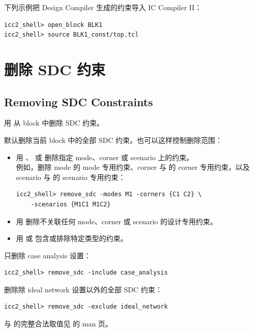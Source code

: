 下列示例把 Design Compiler 生成的约束导入 IC Compiler II：
\begin{lstlisting}
icc2_shell> open_block BLK1
icc2_shell> source BLK1_const/top.tcl
\end{lstlisting}

\section{删除 SDC 约束}
\subsection*{Removing SDC Constraints}

用  从 block 中删除 SDC 约束。

默认删除当前 block 中的全部 SDC 约束。也可以这样控制删除范围：
\begin{itemize}
  \item 用 、 或  删除指定 mode、corner 或 scenario 上的约束。\\
        例如，删除 mode  的 mode 专用约束、corner  与  的 corner 专用约束，以及 scenario  与  的 scenario 专用约束：
\begin{lstlisting}
icc2_shell> remove_sdc -modes M1 -corners {C1 C2} \
    -scenarios {M1C1 M1C2}
\end{lstlisting}
  \item 用  删除不关联任何 mode、corner 或 scenario 的设计专用约束。
  \item 用  或  包含或排除特定类型的约束。
\end{itemize}

只删除 case analysis 设置：
\begin{lstlisting}
icc2_shell> remove_sdc -include case_analysis
\end{lstlisting}

删除除 ideal network 设置以外的全部 SDC 约束：
\begin{lstlisting}
icc2_shell> remove_sdc -exclude ideal_network
\end{lstlisting}

 与  的完整合法取值见  的 man 页。
